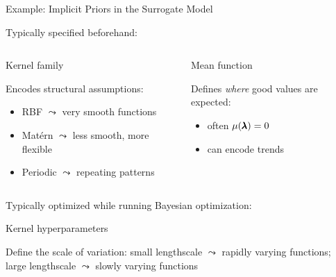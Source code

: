 \documentclass[main]{subfiles}
\begin{document}
\begin{frame}{Example: Implicit Priors in the Surrogate Model}

Typically specified beforehand:
\vspace{-0.3cm}
%
%
\begin{columns}[T,onlytextwidth]
  \vspace{0pt}
  \begin{block}{\raggedright Kernel family}
    \raggedright
    Encodes structural assumptions:
    \begin{itemize}
        \item RBF $\leadsto$ very smooth functions
        \item Mat\'ern $\leadsto$ less smooth, more flexible
        \item Periodic $\leadsto$ repeating patterns
    \end{itemize}
  \end{block}
  \pause
  \vspace{0pt}
  \begin{block}{\raggedright Mean function}
    \raggedright
    Defines \emph{where} good values are expected:
    \begin{itemize}
        \item often $\mu(\pmb{\lambda})=0$
        \item can encode trends
    \end{itemize}
  \end{block}
\end{columns}
\pause
\vspace{0.3cm}
Typically optimized while running Bayesian optimization:
\begin{block}{\raggedright Kernel hyperparameters}
  \raggedright
  Define the scale of variation: small lengthscale $\leadsto$ rapidly varying functions; \\ large lengthscale $\leadsto$ slowly varying functions
\end{block}


\end{frame}
\end{document}
